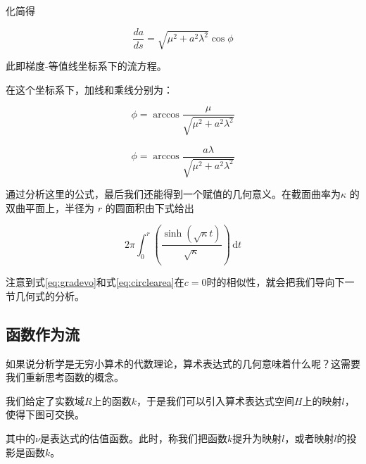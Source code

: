 \documentclass[a4paper,12pt]{article}
\numberwithin{problem}{section}
\numberwithin{definition}{section}
\numberwithin{lemma}{section}
\numberwithin{proposition}{section}
\numberwithin{theorem}{section}
\numberwithin{grammar}{section}
\numberwithin{program}{section}
\numberwithin{convention}{section}
\numberwithin{corollary}{section}
\begin{document}
化简得

\begin{equation}
    \frac{da}{ds} = \sqrt {\mu^2 + a^2 \lambda^2} \cos \phi\label{eq:contourgradient}
\end{equation}

此即梯度-等值线坐标系下的流方程。

在这个坐标系下，加线和乘线分别为：

\begin{equation}
    \phi = \arccos \frac{\mu}{\sqrt {\mu^2 + a^2 \lambda^2}} \label{eq:additionalline}
\end{equation}

\begin{equation}
    \phi = \arccos \frac{a \lambda}{\sqrt {\mu^2 + a^2 \lambda^2}}\label {eq:mulitiplcativeline}
\end{equation}

通过分析这里的公式，最后我们还能得到一个赋值的几何意义。在截面曲率为$\kappa$ 的双曲平面上，半径为 $r$ 的圆面积由下式给出

\begin{equation}
2 \pi \int_0^r \left(\frac{\sinh(\sqrt{\kappa} t)}{\sqrt{\kappa}}\right) \, \mathrm{d}t\label{eq:circlearea}
\end{equation}

注意到式\ref{eq:gradevo}和式\ref{eq:circlearea}在$c=0$时的相似性，就会把我们导向下一节几何式的分析。

\subsection{函数作为流}

如果说分析学是无穷小算术的代数理论，算术表达式的几何意味着什么呢？这需要我们重新思考函数的概念。

我们给定了实数域$R$上的函数$k$，于是我们可以引入算术表达式空间$H$上的映射$l$，使得下图可交换。

\begin{center}
\end{center}

其中的$\nu$是表达式的估值函数。此时，称我们把函数$k$提升为映射$l$，或者映射$l$的投影是函数$k$。
\end{document}
